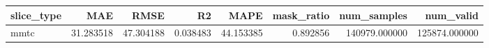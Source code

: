 \begin{tabular}{lrrrrrrr}
\toprule
slice_type & MAE & RMSE & R2 & MAPE & mask_ratio & num_samples & num_valid \\
\midrule
mmtc & 31.283518 & 47.304188 & 0.038483 & 44.153385 & 0.892856 & 140979.000000 & 125874.000000 \\
\bottomrule
\end{tabular}
